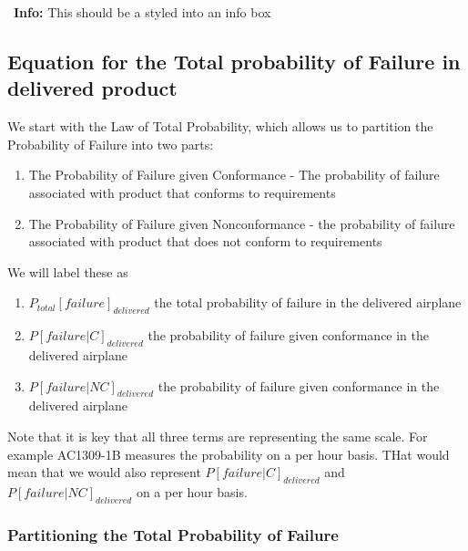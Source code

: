 \documentclass[
]{article}
\providecommand{\tightlist}{%
  \setlength{\itemsep}{0pt}\setlength{\parskip}{0pt}}
\begin{document}
\begin{infobox}
\faInfoCircle\ \textbf{Info:} This should be a styled into an info box
\end{infobox}

\subsection{Equation for the Total probability of Failure in delivered product}\label{equation-for-the-total-probability-of-failure-in-delivered-product}

We start with the Law of Total Probability, which allows us to partition the Probability of Failure into two parts:

\begin{enumerate}
\def\labelenumi{\arabic{enumi}.}
\item
  The Probability of Failure given Conformance - The probability of failure associated with product that conforms to requirements
\item
  The Probability of Failure given Nonconformance - the probability of failure associated with product that does not conform to requirements
\end{enumerate}

We will label these as

\begin{enumerate}
\def\labelenumi{\arabic{enumi}.}
\tightlist
\item
  \(P_{total}[failure]_{delivered}\) the total probability of failure in the delivered airplane
\item
  \(P[failure|C]_{delivered}\) the probability of failure given conformance in the delivered airplane
\item
  \(P[failure|NC]_{delivered}\) the probability of failure given conformance in the delivered airplane
\end{enumerate}

Note that it is key that all three terms are representing the same scale. For example AC1309-1B measures the probability on a per hour basis. THat would mean that we would also represent \(P[failure|C]_{delivered}\) and \(P[failure|NC]_{delivered}\) on a per hour basis.

\subsubsection{Partitioning the Total Probability of Failure}\label{partitioning-the-total-probability-of-failure}
\end{document}
